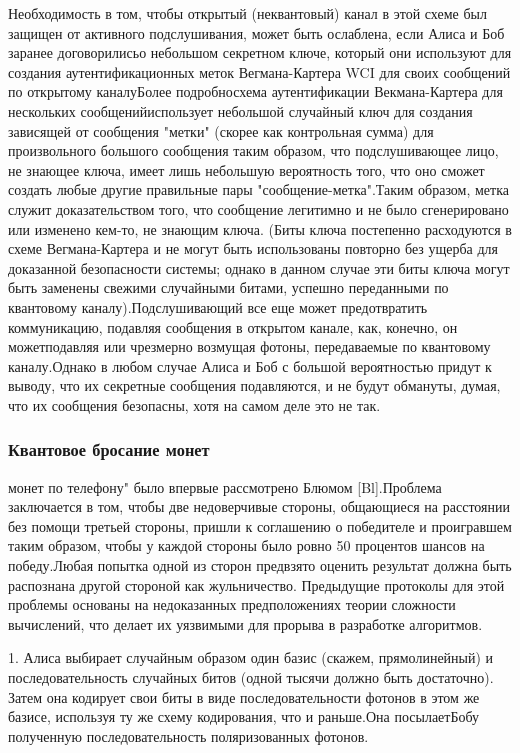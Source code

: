 ­­­­­­Необходимость в том, чтобы открытый (неквантовый) канал в этой схеме был защищен от активного подслушивания, может быть ослаблена, если Алиса и Боб заранее договорилисьо небольшом секретном ключе, который они используют для создания аутентификационных меток Вегмана-Картера WCI для своих сообщений по открытому каналуБолее подробносхема аутентификации Векмана-Картера для нескольких сообщенийиспользует небольшой случайный ключ для создания зависящей от сообщения "метки" (скорее как контрольная сумма) для произвольного большого сообщения таким образом, что подслушивающее лицо, не знающее ключа, имеет лишь небольшую вероятность того, что оно сможет создать любые другие правильные пары "сообщение-метка".Таким образом, метка служит доказательством того, что сообщение легитимно и не было сгенерировано или изменено кем-то, не знающим ключа. (Биты ключа постепенно расходуются в схеме Вегмана-Картера и не могут быть использованы повторно без ущерба для доказанной безопасности системы; однако в данном случае эти биты ключа могут быть заменены свежими случайными битами, успешно переданными по квантовому каналу).Подслушивающий все еще может предотвратить коммуникацию, подавляя сообщения в открытом канале, как, конечно, он можетподавляя или чрезмерно возмущая фотоны, передаваемые по квантовому каналу.Однако в любом случае Алиса и Боб с большой вероятностью придут к выводу, что их секретные сообщения подавляются, и не будут обмануты, думая, что их сообщения безопасны, хотя на самом деле это не так.

\subsubsection{Квантовое бросание монет}

­­­­монет по телефону" было впервые рассмотрено Блюмом [Bl].Проблема заключается в том, чтобы две недоверчивые стороны, общающиеся на расстоянии без помощи третьей стороны, пришли к соглашению о победителе и проигравшем таким образом, чтобы у каждой стороны было ровно 50 процентов шансов на победу.Любая попытка одной из сторон предвзято оценить результат должна быть распознана другой стороной как жульничество. Предыдущие протоколы для этой проблемы основаны на недоказанных предположениях теории сложности вычислений, что делает их уязвимыми для прорыва в разработке алгоритмов.

­­1. Алиса выбирает случайным образом один базис (скажем, прямолинейный) и последовательность случайных битов (одной тысячи должно быть достаточно). Затем она кодирует свои биты в виде последовательности фотонов в этом же базисе, используя ту же схему кодирования, что и раньше.Она посылаетБобу полученную последовательность поляризованных фотонов.

